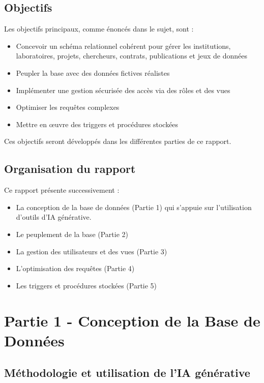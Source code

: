 \documentclass[12pt,a4paper]{article}
\begin{document}
\subsection{Objectifs}
Les objectifs principaux, comme énoncés dans le sujet, sont :
\begin{itemize}
    \item Concevoir un schéma relationnel cohérent pour gérer les institutions, laboratoires, projets, chercheurs, contrats, publications et jeux de données
    \item Peupler la base avec des données fictives réalistes
    \item Implémenter une gestion sécurisée des accès via des rôles et des vues
    \item Optimiser les requêtes complexes
    \item Mettre en œuvre des triggers et procédures stockées
\end{itemize}

Ces objectifs seront développés dans les différentes parties de ce rapport.

\subsection{Organisation du rapport}
Ce rapport présente successivement :
\begin{itemize}
    \item La conception de la base de données (Partie 1) qui s'appuie sur l'utilisation d'outils d'IA générative.
    \item Le peuplement de la base (Partie 2)
    \item La gestion des utilisateurs et des vues (Partie 3)
    \item L'optimisation des requêtes (Partie 4)
    \item Les triggers et procédures stockées (Partie 5)
\end{itemize}

\newpage

\section{Partie 1 - Conception de la Base de Données}

\subsection{Méthodologie et utilisation de l'IA générative}
\end{document}
